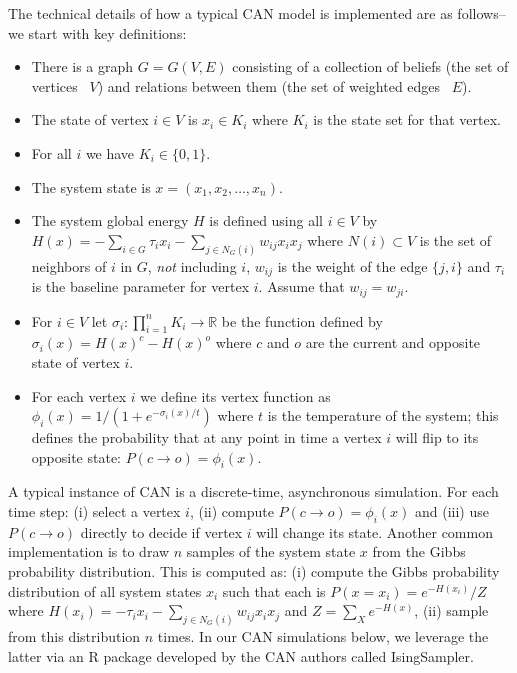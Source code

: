 \documentclass[10pt,letterpaper]{article}
\begin{document}
The technical details of how a typical CAN model is implemented are as follows--we start with key definitions:  

\begin{itemize}
\item There is a graph $G = G(V,E)$ consisting of a collection of beliefs (the set of vertices ~$V$) and relations between them (the set of weighted edges ~$E$).
\item The state of vertex $i\in V$ is $x_i \in K_i$ where $K_i$ is the state set for that vertex. 
\item For all $i$ we have $K_i \in \{0,1\}$.
\item The system state is $x = (x_1, x_2, \ldots, x_n)$.
\item The system global energy $H$ is defined using all $i \in V$ by $H(x) = 
-\sum_{i \in G} \tau_i x_i - \sum_{j\in N_G(i)} w_{ij} x_i x_j$ where $N(i) \subset V$ is the set of neighbors of $i$ in $G$, \emph{not} including $i$, $w_{ij}$ is the weight of the edge $\{j,i\}$ and $\tau_i$ is the baseline parameter for vertex $i$.  Assume that $w_{ij} = w_{ji}$.
\item For $i\in V$ let $\sigma_i \colon \prod_{i=1}^n K_i \longrightarrow \mathbb{R}$ be the function defined by $\sigma_i(x) = H(x)^c - H(x)^o$ where $c$ and $o$ are the current and opposite state of vertex $i$.
\item For each vertex $i$ we define its vertex function as $\phi_i(x) = 1/(1+e^{-\sigma_i(x)/t})$ where $t$ is the temperature of the system; this defines the probability that at any point in time a vertex $i$ will flip to its opposite state: $P(c \longrightarrow o) = \phi_i(x)$. 
\end{itemize}

A typical instance of CAN is a discrete-time, asynchronous simulation.  For each time step: (i) select a vertex $i$, (ii) compute $P(c \longrightarrow o) = \phi_i(x)$ and (iii) use $P(c \longrightarrow o)$ directly to decide if vertex $i$ will change its state.  Another common implementation is to draw $n$ samples of the system state $x$ from the Gibbs probability distribution. This is computed as: (i) compute the Gibbs probability distribution of all system states $x_i$ such that each is $P(x = x_i) = e^{-H(x_i)}/Z$ where $H(x_i) = 
-\tau_i x_i - \sum_{j\in N_G(i)} w_{ij} x_i x_j$ and $Z = \sum_{X} e^{-H(x)}$, (ii) sample from this distribution $n$ times.  In our CAN simulations below, we leverage the latter via an R package developed by the CAN authors called IsingSampler.
\end{document}
